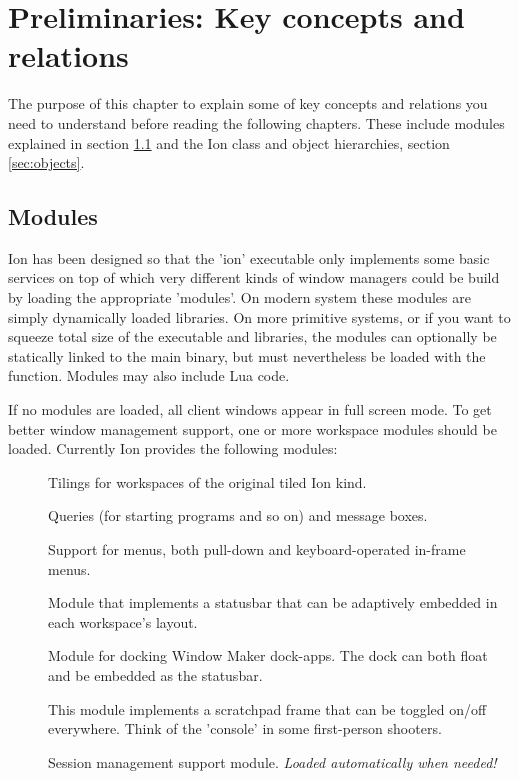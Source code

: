 
\chapter{Preliminaries: Key concepts and relations}
\label{chap:prelim}

The purpose of this chapter to explain some of key concepts and
relations you need to understand before reading the following
chapters. These include modules explained in section \ref{sec:modules}
and the Ion class and object hierarchies, section \ref{sec:objects}.


\section{Modules}
\label{sec:modules}

Ion has been designed so that the 'ion' executable only implements some
basic services on top of which very different kinds of window managers
could be build by loading the appropriate 'modules'. On modern system
these modules are simply dynamically loaded  libraries. On 
more primitive systems, or if you want to squeeze total size of the 
executable and libraries, the modules can optionally be statically 
linked to the main binary, but must nevertheless be loaded with the
 function. Modules may also include Lua code.

If no modules are loaded, all client windows appear in full screen mode.
To get better window management support, one or more workspace modules
should be loaded. Currently Ion provides the following modules:

\begin{description}
    \item[] Tilings for workspaces of the original tiled
       Ion kind.
    \item[] Queries (for starting programs and so on)
      and message boxes.
    \item[] Support for menus, both pull-down and
      keyboard-operated in-frame menus.
    \item[] Module that implements a statusbar that
      can be adaptively embedded in each workspace's layout.
    \item[] Module for docking Window Maker dock-apps.
      The dock can both float and be embedded as the statusbar.
    \item[] This module implements a scratchpad frame that can
      be toggled on/off everywhere. Think of the 'console' in some 
      first-person shooters.
    \item[] Session management support module.
      \emph{Loaded automatically when needed!}
\end{description}

